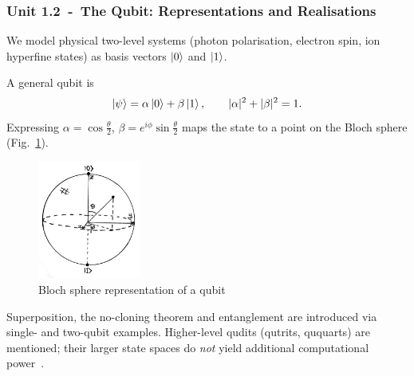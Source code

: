 \subsubsection*{Unit 1.2 - The Qubit: Representations and Realisations}

We model physical two-level systems (photon polarisation, electron spin, ion hyperfine states)
as basis vectors $\ket{0}$ and $\ket{1}$.

A general qubit is
\[
\ket{\psi} = \alpha\ket{0} + \beta\ket{1}, \qquad |\alpha|^{2}+|\beta|^{2}=1.
\]
Expressing 
$\alpha = \cos\frac{\theta}{2}$, $\beta = e^{i\phi}\sin\frac{\theta}{2}$ 
maps the state to a point on the Bloch sphere (Fig.~\ref{fig:bloch}).

\begin{figure}[ht] 
	\begin{adjustbox}{center}
		\includegraphics[width=0.3\textwidth, inner]{figures/blochsphere.png}
	\end{adjustbox}
	\vspace{4pt}
	\caption{Bloch sphere representation of a qubit}
	\label{fig:bloch}
\end{figure}


Superposition, the no-cloning theorem and entanglement are introduced
via single- and two-qubit examples.  Higher-level qudits (qutrits,
ququarts) are mentioned; their larger state spaces do \emph{not} yield
additional computational power \cite{Lipton:2021}.  




